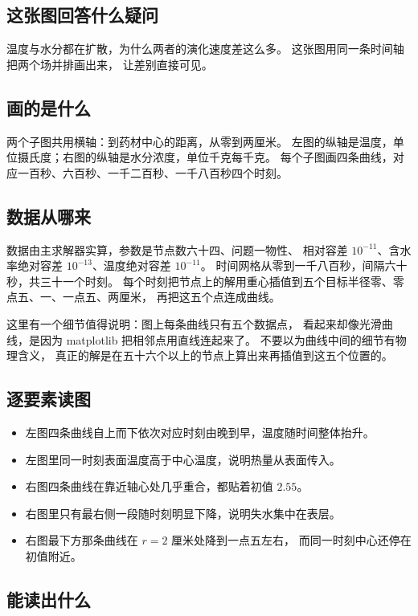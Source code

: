 \documentclass[11pt,a4paper]{article}
\begin{document}
\subsection{这张图回答什么疑问}

温度与水分都在扩散，为什么两者的演化速度差这么多。
这张图用同一条时间轴把两个场并排画出来，
让差别直接可见。

\subsection{画的是什么}

两个子图共用横轴：到药材中心的距离，从零到两厘米。
左图的纵轴是温度，单位摄氏度；右图的纵轴是水分浓度，单位千克每千克。
每个子图画四条曲线，对应一百秒、六百秒、一千二百秒、一千八百秒四个时刻。

\subsection{数据从哪来}

数据由主求解器实算，参数是节点数六十四、问题一物性、
相对容差 $10^{-11}$、含水率绝对容差 $10^{-13}$、温度绝对容差 $10^{-11}$。
时间网格从零到一千八百秒，间隔六十秒，共三十一个时刻。
每个时刻把节点上的解用重心插值到五个目标半径零、零点五、一、一点五、两厘米，
再把这五个点连成曲线。

这里有一个细节值得说明：图上每条曲线只有五个数据点，
看起来却像光滑曲线，是因为 matplotlib 把相邻点用直线连起来了。
不要以为曲线中间的细节有物理含义，
真正的解是在五十六个以上的节点上算出来再插值到这五个位置的。

\subsection{逐要素读图}

\begin{itemize}[leftmargin=1.6em]
\item 左图四条曲线自上而下依次对应时刻由晚到早，温度随时间整体抬升。
\item 左图里同一时刻表面温度高于中心温度，说明热量从表面传入。
\item 右图四条曲线在靠近轴心处几乎重合，都贴着初值 $2.55$。
\item 右图里只有最右侧一段随时刻明显下降，说明失水集中在表层。
\item 右图最下方那条曲线在 $r=2$ 厘米处降到一点五左右，
      而同一时刻中心还停在初值附近。
\end{itemize}

\subsection{能读出什么}
\end{document}
